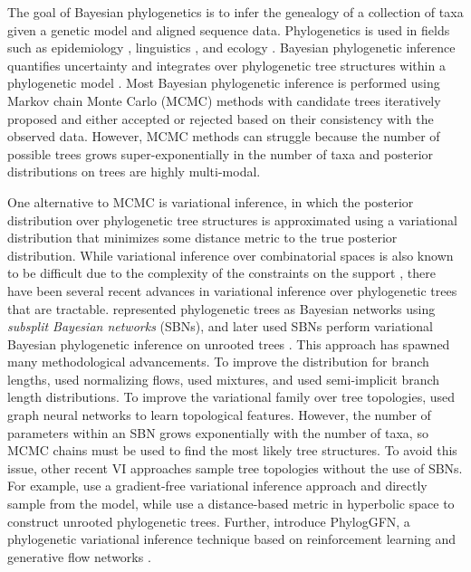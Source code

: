 The goal of Bayesian phylogenetics is to infer the genealogy of a collection of taxa given a genetic model and aligned sequence data. Phylogenetics is used in fields such as epidemiology \citep{Li:2020}, linguistics \citep{List:2014}, and ecology \citep{Godoy:2018}. Bayesian phylogenetic inference quantifies uncertainty and integrates over phylogenetic tree structures within a phylogenetic model \citep{Zhang:2019}. 
%
Most Bayesian phylogenetic inference is performed using Markov chain Monte Carlo (MCMC) methods with candidate trees iteratively proposed and either accepted or rejected based on their consistency with the observed data. However, MCMC methods can struggle because the number of possible trees grows super-exponentially in the number of taxa and posterior distributions on trees are highly multi-modal.

One alternative to MCMC is variational inference, in which the posterior distribution over phylogenetic tree structures is approximated using a variational distribution that minimizes some distance metric to the true posterior distribution. While variational inference over combinatorial spaces is also known to be difficult due to the complexity of the constraints on the support \citep{Bouchard:2010, Linderman:2018}, there have been several recent advances in variational inference over phylogenetic trees that are tractable. \citet{Zhang:2018} represented phylogenetic trees as Bayesian networks using \textit{subsplit Bayesian networks} (SBNs), and later used SBNs perform variational Bayesian phylogenetic inference on unrooted trees \citep{Zhang:2019}. This approach has spawned many methodological advancements. To improve the distribution for branch lengths, \citet{Zhang:2020} used normalizing flows, \citet{Molen:2024} used mixtures, and \citet{Xie:2024} used semi-implicit branch length distributions. To improve the variational family over tree topologies, \citet{Zhang:2023} used graph neural networks to learn topological features. 
%
However, the number of parameters within an SBN grows exponentially with the number of taxa, so MCMC chains must be used to find the most likely tree structures. To avoid this issue, other recent VI approaches sample tree topologies without the use of SBNs. For example, \citet{Koptagel:2022} use a gradient-free variational inference approach and directly sample from the \citet{Jukes:1969} model, while \citet{Mimori:2023} use a distance-based metric in hyperbolic space to construct unrooted phylogenetic trees. Further, \citet{Zhou:2024} introduce PhylogGFN, a phylogenetic variational inference technique based on reinforcement learning and generative flow networks \citep{Bengio:2023}.


